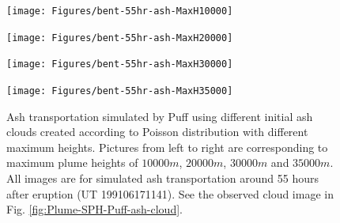 \documentclass[draft,linenumbers]{agujournal2019}
\begin{document}
\begin{figure}[!htb]
\centering
\begin{minipage}{.245\textwidth}
\centering
\texttt{[image: Figures/bent-55hr-ash-MaxH10000]}
\end{minipage}%
\begin{minipage}{.245 \textwidth}
\centering
\texttt{[image: Figures/bent-55hr-ash-MaxH20000]}
\end{minipage}%
\begin{minipage}{.245 \textwidth}
\centering
\texttt{[image: Figures/bent-55hr-ash-MaxH30000]}
\end{minipage}%
\begin{minipage}{.245 \textwidth}
\centering
\texttt{[image: Figures/bent-55hr-ash-MaxH35000]}
\end{minipage}%
\caption{Ash transportation simulated by Puff using different initial ash clouds created according to Poisson distribution with different maximum heights. Pictures from left to right are corresponding to maximum plume heights of $10000 m$, $20000 m$, $30000 m$ and $35000 m$. All images are for simulated ash transportation around 55 hours after eruption (UT 199106171141). See the observed cloud image in Fig. \ref{fig:Plume-SPH-Puff-ash-cloud}.}
\label{fig:Various-Maximum-height-Pinatubo-ash-cloud}
\end{figure}
\end{document}
